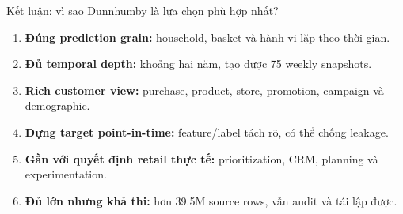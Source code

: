 \documentclass[aspectratio=169,11pt]{beamer}
\begin{document}
\begin{frame}{Kết luận: vì sao Dunnhumby là lựa chọn phù hợp nhất?}
  \begin{enumerate}
    \item \textbf{Đúng prediction grain:} household, basket và hành vi lặp theo thời gian.
    \item \textbf{Đủ temporal depth:} khoảng hai năm, tạo được 75 weekly snapshots.
    \item \textbf{Rich customer view:} purchase, product, store, promotion, campaign và demographic.
    \item \textbf{Dựng target point-in-time:} feature/label tách rõ, có thể chống leakage.
    \item \textbf{Gần với quyết định retail thực tế:} prioritization, CRM, planning và experimentation.
    \item \textbf{Đủ lớn nhưng khả thi:} hơn 39.5M source rows, vẫn audit và tái lập được.
  \end{enumerate}
  \vspace{0.35cm}
  \begin{center}
  \end{center}
\end{frame}
\end{document}
